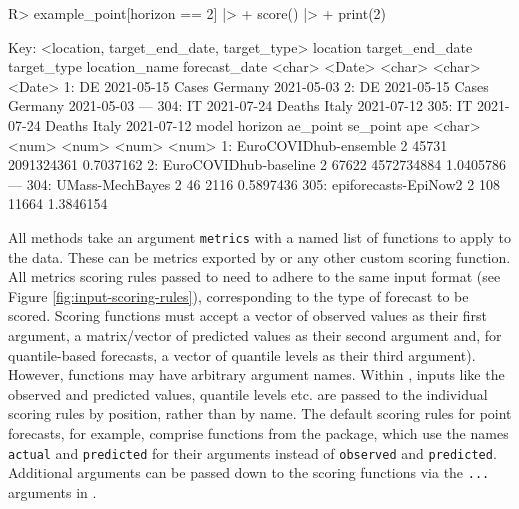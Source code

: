 \documentclass[
]{jss}
\begin{document}
\begin{CodeChunk}
\begin{CodeInput}
R> example_point[horizon == 2] |>
+   score() |>
+   print(2)
\end{CodeInput}
\begin{CodeOutput}
Key: <location, target_end_date, target_type>
     location target_end_date target_type location_name forecast_date
       <char>          <Date>      <char>        <char>        <Date>
  1:       DE      2021-05-15       Cases       Germany    2021-05-03
  2:       DE      2021-05-15       Cases       Germany    2021-05-03
 ---                                                                 
304:       IT      2021-07-24      Deaths         Italy    2021-07-12
305:       IT      2021-07-24      Deaths         Italy    2021-07-12
                     model horizon ae_point   se_point       ape
                    <char>   <num>    <num>      <num>     <num>
  1: EuroCOVIDhub-ensemble       2    45731 2091324361 0.7037162
  2: EuroCOVIDhub-baseline       2    67622 4572734884 1.0405786
 ---                                                            
304:       UMass-MechBayes       2       46       2116 0.5897436
305:  epiforecasts-EpiNow2       2      108      11664 1.3846154
\end{CodeOutput}
\end{CodeChunk}

All  methods take an argument \texttt{metrics} with a
named list of functions to apply to the data. These can be metrics
exported by  or any other custom scoring function. All
metrics scoring rules passed to  need to adhere to the
same input format (see Figure \ref{fig:input-scoring-rules}),
corresponding to the type of forecast to be scored. Scoring functions
must accept a vector of observed values as their first argument, a
matrix/vector of predicted values as their second argument and, for
quantile-based forecasts, a vector of quantile levels as their third
argument). However, functions may have arbitrary argument names. Within
, inputs like the observed and predicted values, quantile
levels etc. are passed to the individual scoring rules by position,
rather than by name. The default scoring rules for point forecasts, for
example, comprise functions from the  package, which use
the names \texttt{actual} and \texttt{predicted} for their arguments
instead of \texttt{observed} and \texttt{predicted}. Additional
arguments can be passed down to the scoring functions via the
\texttt{...} arguments in .
\end{document}
